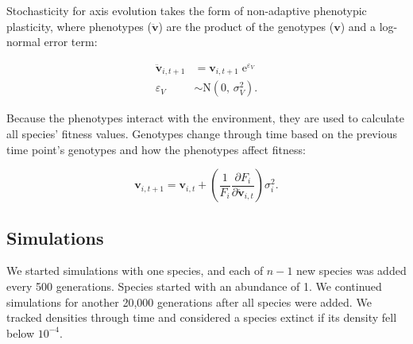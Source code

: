 Stochasticity for axis evolution takes the form of non-adaptive
phenotypic plasticity,
where phenotypes ($\mathbf{\ddot{v}}$) are the product of the
genotypes ($\mathbf{v}$) and a log-normal error term:

\begin{equation} \label{eq:V-stochasticity}
\begin{split}
    \mathbf{\ddot{v}}_{i,t+1} &= \mathbf{v}_{i,t+1} \; \text{e}^{\varepsilon_V} \\
    \varepsilon_V &\sim \text{N}(0, \, \sigma^2_V)
    \text{.}
\end{split}
\end{equation}


Because the phenotypes interact with the environment, they are used
to calculate all species' fitness values.
Genotypes change through time based on the previous time point's 
genotypes and how the phenotypes affect fitness:

\begin{equation} \label{eq:axis-change-stochastic}
    \mathbf{v}_{i,t+1} = \mathbf{v}_{i,t} + \left( \frac{1}{F_i}
        \frac{\partial F_i}{\partial \mathbf{\ddot{v}}_{i,t}} \right) \sigma^2_i
    \textrm{.}
\end{equation}





\subsection*{Simulations}


We started simulations with one species, and each of $n-1$ new species
was added every 500 generations.
Species started with an abundance of 1.
We continued simulations for another 20,000 generations after all
species were added.
We tracked densities through time and considered a species extinct if its 
density fell below $10^{-4}$.






